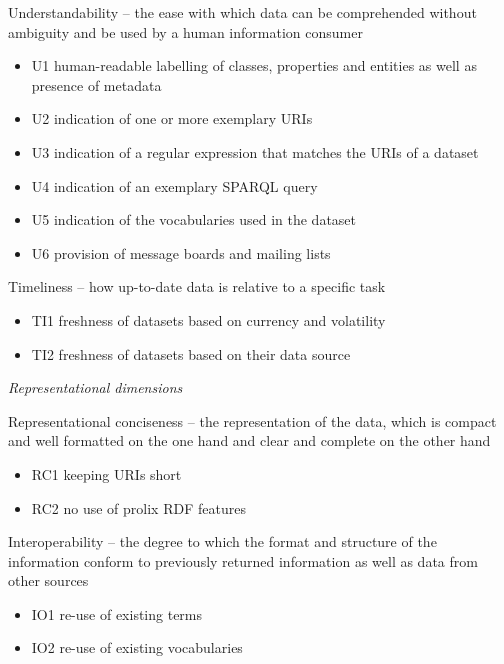 Understandability -- the ease with which data can be comprehended without ambiguity and be used by a human information consumer
\begin{itemize}
 \setlength{\parskip}{0pt}
 \setlength{\itemsep}{0pt plus 1pt}
 \item U1 human-readable labelling of classes, properties and entities as well as presence of metadata
 \item U2 indication of one or more exemplary URIs
 \item U3 indication of a regular expression that matches the URIs of a dataset
 \item U4 indication of an exemplary SPARQL query
 \item U5 indication of the vocabularies used in the dataset
 \item U6 provision of message boards and mailing lists
\end{itemize}

Timeliness -- how up-to-date data is relative to a specific task
\begin{itemize}
 \setlength{\parskip}{0pt}
 \setlength{\itemsep}{0pt plus 1pt}
 \item TI1 freshness of datasets based on currency and volatility
 \item TI2 freshness of datasets based on their data source
\end{itemize}

\emph{Representational dimensions}

Representational conciseness -- the representation of the data, which is compact and well formatted on the one hand and clear and complete on the other hand
\begin{itemize}
 \setlength{\parskip}{0pt}
 \setlength{\itemsep}{0pt plus 1pt}
 \item RC1 keeping URIs short
 \item RC2 no use of prolix RDF features
\end{itemize}

Interoperability -- the degree to which the format and structure of the information conform to previously returned information as well as data from other sources
\begin{itemize}
 \setlength{\parskip}{0pt}
 \setlength{\itemsep}{0pt plus 1pt}
 \item IO1 re-use of existing terms
 \item IO2 re-use of existing vocabularies
\end{itemize}

